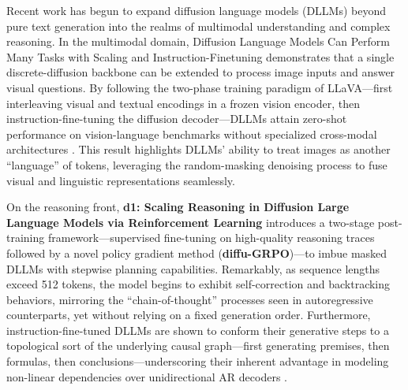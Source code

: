 Recent work has begun to expand diffusion language models (DLLMs) beyond pure text generation into the realms of multimodal understanding and complex reasoning. In the multimodal domain, Diffusion Language Models Can Perform Many Tasks with Scaling and Instruction-Finetuning demonstrates that a single discrete-diffusion backbone can be extended to process image inputs and answer visual questions. By following the two-phase training paradigm of LLaVA—first interleaving visual and textual encodings in a frozen vision encoder, then instruction-fine-tuning the diffusion decoder—DLLMs attain zero-shot performance on vision-language benchmarks without specialized cross-modal architectures \cite{ye_diffusion_2025}. This result highlights DLLMs’ ability to treat images as another “language” of tokens, leveraging the random-masking denoising process to fuse visual and linguistic representations seamlessly.

On the reasoning front, \textbf{d1: Scaling Reasoning in Diffusion Large Language Models via Reinforcement Learning} introduces a two-stage post-training framework—supervised fine-tuning on high-quality reasoning traces followed by a novel policy gradient method (\textbf{diffu-GRPO})—to imbue masked DLLMs with stepwise planning capabilities. Remarkably, as sequence lengths exceed 512 tokens, the model begins to exhibit self-correction and backtracking behaviors, mirroring the “chain-of-thought” processes seen in autoregressive counterparts, yet without relying on a fixed generation order. Furthermore, instruction-fine-tuned DLLMs are shown to conform their generative steps to a topological sort of the underlying causal graph—first generating premises, then formulas, then conclusions—underscoring their inherent advantage in modeling non-linear dependencies over unidirectional AR decoders \cite{zhao_d1_2025}.

